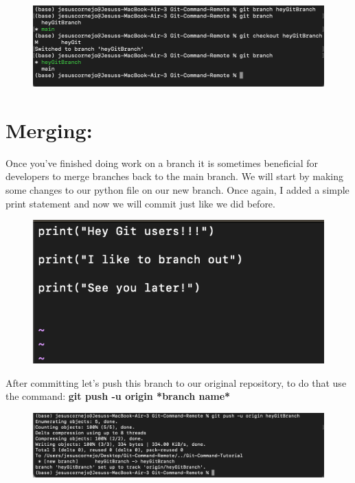 \documentclass{article}
\begin{document}
\begin{figure}[h]
\includegraphics[scale = 0.8]{screenshots/sc10.png}
\centering
\end{figure}


\newpage

\section{Merging:}
Once you've finished doing work on a branch it is sometimes beneficial for developers to merge branches back to the main branch. We will start by making some changes to our python file on our new branch. Once again, I added a simple print statement and now we will commit just like we did before.

\begin{figure}[h]
\includegraphics[scale = 1]{screenshots/sc11.png}
\centering
\end{figure}

After committing let's push this branch to our original repository, to do that use the command: \textbf{git push -u origin *branch name*}

\begin{figure}[h]
\includegraphics[scale = 0.7]{screenshots/sc12.png}
\centering
\end{figure}
\end{document}
